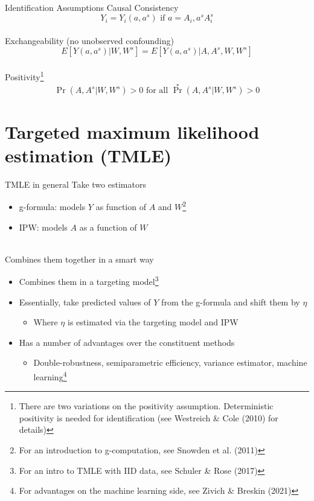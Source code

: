 \documentclass{beamer}
\begin{document}
\begin{frame}{Identification Assumptions}
	Causal Consistency
	\[Y_i = Y_i(a, a^s) \text{ if } a=A_i, a^sA_i^s\]~\\
	Exchangeability (no unobserved confounding)
	\[E[Y(a,a^s) | W,W^s] = E[Y(a,a^s) | A,A^s,W,W^s]\]~\\
	Positivity\footnote[frame]{There are two variations on the positivity assumption. Deterministic positivity is needed for identification (see Westreich \& Cole (2010) for details)}
	\[\Pr(A,A^s | W,W^s) > 0 \text{ for all } \Pr^*(A,A^s | W,W^s) > 0\]
\end{frame}

\section{Targeted maximum likelihood estimation (TMLE)}

\begin{frame}{TMLE in general}
	Take two estimators
	\begin{itemize}
		\item g-formula: models $Y$ as function of $A$ and $W$\footnote[frame]{For an introduction to g-computation, see Snowden et al. (2011)}
		\item IPW: models $A$ as a function of $W$
	\end{itemize}~\\
	Combines them together in a smart way
	\begin{itemize}
		\item Combines them in a targeting model\footnote[frame]{For an intro to TMLE with IID data, see Schuler \& Rose (2017)}
		\item Essentially, take predicted values of $Y$ from the g-formula and shift them by $\eta$
		\begin{itemize}
			\item Where $\eta$ is estimated via the targeting model and IPW
		\end{itemize}
		\item Has a number of advantages over the constituent methods
		\begin{itemize}
			\item Double-robustness, semiparametric efficiency, variance estimator, machine learning\footnote[frame]{For advantages on the machine learning side, see Zivich \& Breskin (2021)}
		\end{itemize}
		
	\end{itemize}
\end{frame}
\end{document}
